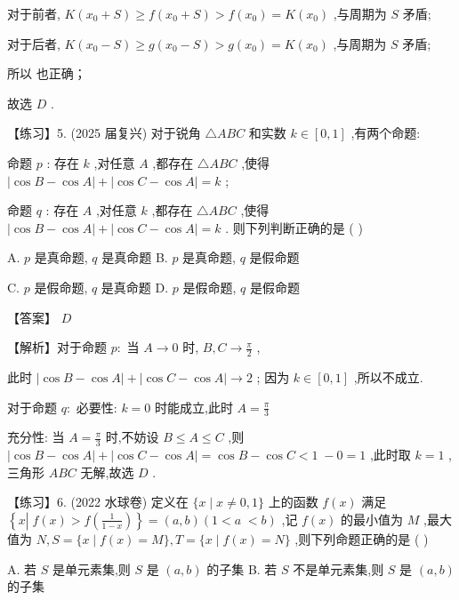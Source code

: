 \documentclass[10pt]{article}
\newcommand*\circled[1]{\tikz[baseline=(char.base)]{\node[shape=circle,draw,inner sep=1.5pt] (char) {\small #1};}}
\begin{document}
对于前者, \(K\left( {{x}_{0} + S}\right)  \geq  f\left( {{x}_{0} + S}\right)  > f\left( {x}_{0}\right)  = K\left( {x}_{0}\right)\) ,与周期为 \(S\) 矛盾;

对于后者, \(K\left( {{x}_{0} - S}\right)  \geq  g\left( {{x}_{0} - S}\right)  > g\left( {x}_{0}\right)  = K\left( {x}_{0}\right)\) ,与周期为 \(S\) 矛盾;

所以 \circled{3} 也正确；

故选 \(D\) .

【练习】5. (2025 届复兴) 对于锐角 \(\bigtriangleup {ABC}\) 和实数 \(k \in  \left\lbrack  {0,1}\right\rbrack\) ,有两个命题:

命题 \(p\) : 存在 \(k\) ,对任意 \(A\) ,都存在 \(\bigtriangleup {ABC}\) ,使得 \(\left| {\cos B - \cos A}\right|  + \left| {\cos C - \cos A}\right|  = k\) ;

命题 \(q\) : 存在 \(A\) ,对任意 \(k\) ,都存在 \(\bigtriangleup {ABC}\) ,使得 \(\left| {\cos B - \cos A}\right|  + \left| {\cos C - \cos A}\right|  = k\) . 则下列判断正确的是 ( )

A. \(p\) 是真命题, \(q\) 是真命题 B. \(p\) 是真命题, \(q\) 是假命题

C. \(p\) 是假命题, \(q\) 是真命题 D. \(p\) 是假命题, \(q\) 是假命题

【答案】 \(D\)

【解析】对于命题 \(p :\) 当 \(A \rightarrow  0\) 时, \(B,C \rightarrow  \frac{\pi }{2}\) ,

此时 \(\left| {\cos B - \cos A}\right|  + \left| {\cos C - \cos A}\right|  \rightarrow  2\) ; 因为 \(k \in  \left\lbrack  {0,1}\right\rbrack\) ,所以不成立.

对于命题 \(q :\) 必要性: \(k = 0\) 时能成立,此时 \(A = \frac{\pi }{3}\)

充分性: 当 \(A = \frac{\pi }{3}\) 时,不妨设 \(B \leq  A \leq  C\) ,则 \(\left| {\cos B - \cos A}\right|  + \left| {\cos C - \cos A}\right|  = \cos B - \cos C < 1 \; - 0 = 1\) ,此时取 \(k = 1\) ,三角形 \({ABC}\) 无解,故选 \(D\) .

【练习】6. (2022 水球卷) 定义在 \(\{ x \mid  x \neq  0,1\}\) 上的函数 \(f\left( x\right)\) 满足 \(\left\{  {x\left| {\;f\left( x\right)  > f\left( \frac{1}{1 - x}\right) }\right. }\right\}   = \left( {a,b}\right) (1 < a \; < b)\) ,记 \(f\left( x\right)\) 的最小值为 \(M\) ,最大值为 \(N,S = \{ x \mid  f\left( x\right)  = M\} ,T = \{ x \mid  f\left( x\right)  = N\}\) ,则下列命题正确的是 ( )

A. 若 \(S\) 是单元素集,则 \(S\) 是 \(\left( {a,b}\right)\) 的子集 B. 若 \(S\) 不是单元素集,则 \(S\) 是 \(\left( {a,b}\right)\) 的子集
\end{document}
